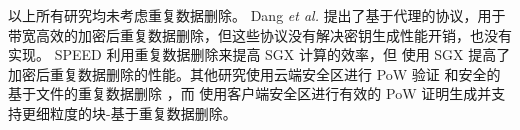 以上所有研究均未考虑重复数据删除。 Dang \textit{ et al.} \cite{dang2017Privacy} 提出了基于代理的协议，用于带宽高效的加密后重复数据删除，但这些协议没有解决密钥生成性能开销，也没有实现。 SPEED \cite{cui2019SPEED} 利用重复数据删除来提高 SGX 计算的效率，但 \sysnameS 使用 SGX 提高了加密后重复数据删除的性能。其他研究使用云端安全区进行 PoW 验证 \cite{you2020Proofs} 和安全的基于文件的重复数据删除 \cite{fuhry20}，而 \sysnameS 使用客户端安全区进行有效的 PoW 证明生成并支持更细粒度的块-基于重复数据删除。

